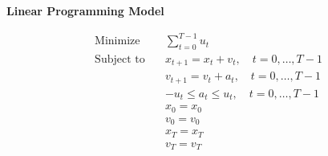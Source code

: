 \documentclass{article}
\begin{document}
\textbf{Linear Programming Model}

\[
\begin{align*}
\text{Minimize} \quad & \sum_{t=0}^{T-1} u_t \\
\text{Subject to} \quad & x_{t+1} = x_t + v_t, \quad t = 0, \ldots, T-1 \\
& v_{t+1} = v_t + a_t, \quad t = 0, \ldots, T-1 \\
& -u_t \leq a_t \leq u_t, \quad t = 0, \ldots, T-1 \\
& x_0 = x_0 \\
& v_0 = v_0 \\
& x_T = x_T \\
& v_T = v_T \\
\end{align*}
\]
\end{document}
